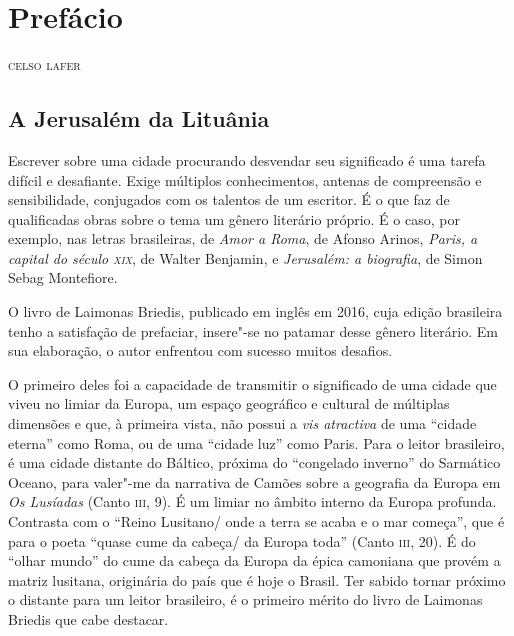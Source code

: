 \chapter[Prefácio, \textit{por Celso Lafer}]{Prefácio }

\begin{flushright}
\textsc{celso lafer}
\end{flushright}

\section*{A Jerusalém da Lituânia}

\noindent{}Escrever sobre uma cidade procurando desvendar seu significado é uma
tarefa difícil e desafiante. Exige múltiplos conhecimentos, antenas de
compreensão e sensibilidade, conjugados com os talentos de um escritor.
É o que faz de qualificadas obras sobre o tema um gênero literário
próprio. É o caso, por exemplo, nas letras brasileiras, de \textit{Amor a
Roma}, de Afonso Arinos, \textit{Paris, a capital do século \textsc{xix}},
de Walter Benjamin, e \textit{Jerusalém: a biografia}, de Simon Sebag
Montefiore.

O livro de Laimonas Briedis, publicado em inglês em 2016, cuja edição
brasileira tenho a satisfação de prefaciar, insere"-se no patamar desse
gênero literário. Em sua elaboração, o autor enfrentou com sucesso
muitos desafios.

O primeiro deles foi a capacidade de transmitir o significado de uma
cidade que viveu no limiar da Europa, um espaço geográfico e cultural de
múltiplas dimensões e que, à primeira vista, não possui a \textit{vis
atractiva} de uma ``cidade eterna'' como Roma, ou de uma ``cidade luz''
como Paris. Para o leitor brasileiro, é uma cidade distante do Báltico,
próxima do ``congelado inverno'' do Sarmático Oceano, para valer"-me da
narrativa de Camões sobre a geografia da Europa em \textit{Os Lusíadas}
(Canto \textsc{iii}, 9). É um limiar no âmbito interno da Europa profunda. Contrasta
com o ``Reino Lusitano/ onde a terra se acaba e o mar começa'', que é
para o poeta ``quase cume da cabeça/ da Europa toda'' (Canto \textsc{iii}, 20). 
É do ``olhar mundo'' do cume da cabeça da Europa da
épica camoniana que provém a matriz lusitana, originária do país que é
hoje o Brasil. Ter sabido tornar próximo o distante para um leitor
brasileiro, é o primeiro mérito do livro de Laimonas Briedis que cabe
destacar.

